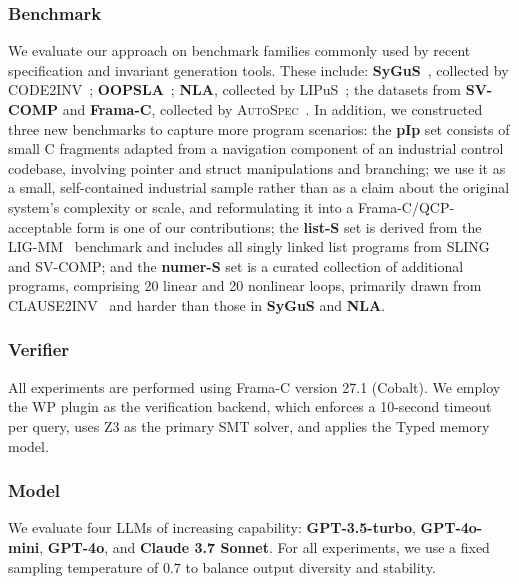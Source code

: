 \documentclass[lettersize,journal]{IEEEtran}
\newcommand{\autospec}{\textsc{AutoSpec}}
\begin{document}
\subsubsection*{Benchmark}
We evaluate our approach on benchmark families commonly used by recent specification and invariant generation tools. These include:  \textbf{SyGuS}~\cite{alur2019sygus}, collected by CODE2INV~\cite{Code2Inv_a_Deep_Learning_Framework_for_Program_Verification}; \textbf{OOPSLA}~\cite{Inductive_Invariant_Generation_via_Abductive_Inference}; \textbf{NLA}, collected by LIPuS~\cite{Loop_Invariant_Inference_through_SMT_Solving_Enhanced_Reinforcement_Learning}; the datasets from \textbf{SV-COMP} and \textbf{Frama-C}, collected by \autospec~\cite{autospec}.
In addition, we constructed three new benchmarks to capture more program scenarios: the \textbf{pIp} set consists of small C fragments adapted from a navigation component of an industrial control codebase, involving pointer and struct manipulations and branching; we use it as a small, self-contained industrial sample rather than as a claim about the original system's complexity or scale, and reformulating it into a Frama-C/QCP-acceptable form is one of our contributions;
the \textbf{list-S} set is derived from the LIG-MM~\cite{LIG-MM} benchmark and includes all singly linked list programs from SLING and SV-COMP; and the \textbf{numer-S} set is a curated collection of additional programs, comprising 20 linear and 20 nonlinear loops, primarily drawn from CLAUSE2INV~\cite{DBLP:journals/pacmse/CaoWXYWCM25} and harder than those in \textbf{SyGuS} and \textbf{NLA}.



\subsubsection*{Verifier}

All experiments are performed using Frama-C version 27.1 (Cobalt). We employ the WP plugin as the verification backend, which enforces a 10-second timeout per query, uses Z3 as the primary SMT solver, and applies the Typed memory model.  

\subsubsection*{Model}
We evaluate four LLMs of increasing capability: \textbf{GPT-3.5-turbo}, \textbf{GPT-4o-mini}, \textbf{GPT-4o}, and \textbf{Claude 3.7 Sonnet}. For all experiments, we use a fixed sampling temperature of $0.7$ to balance output diversity and stability.
\end{document}

